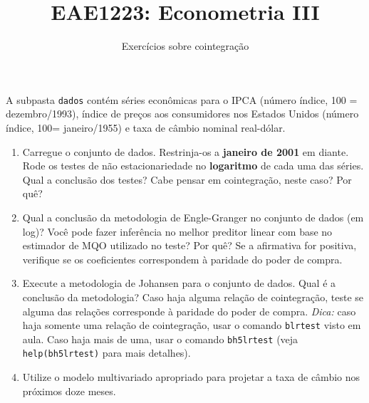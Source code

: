 \documentclass[10pt,a4paper]{article}
\title{\large EAE1223: Econometria III}
\author{\normalsize Exercícios sobre cointegração}
\date{}
\begin{document}
	\maketitle
	
A subpasta \texttt{dados} contém séries econômicas para o IPCA (número índice, 100 = dezembro/1993), índice de preços aos consumidores nos Estados Unidos (número índice, 100= janeiro/1955) e taxa de câmbio nominal real-dólar.
	
	
	\begin{enumerate}
		\item Carregue o conjunto de dados. Restrinja-os a \textbf{janeiro de 2001} em diante. Rode os testes de não estacionariedade no \textbf{logaritmo} de cada uma das séries. Qual a conclusão dos testes? Cabe pensar em cointegração, neste caso? Por quê?
		
		\item Qual a conclusão da metodologia de Engle-Granger no conjunto de dados (em log)? Você pode fazer inferência no melhor preditor linear com base no estimador de MQO utilizado no teste? Por quê? Se a afirmativa for positiva, verifique se os coeficientes correspondem à paridade do poder de compra.
		
		\item Execute a metodologia de Johansen para o conjunto de dados. Qual é a conclusão da metodologia? Caso haja alguma relação de cointegração, teste se alguma das relações corresponde à paridade do poder de compra. \textit{Dica:} caso haja somente uma relação de cointegração, usar o comando \texttt{blrtest} visto em aula. Caso haja mais de uma, usar o comando \texttt{bh5lrtest} (veja \texttt{help(bh5lrtest)} para mais detalhes).
		
		\item Utilize o modelo multivariado apropriado para projetar a taxa de câmbio nos próximos doze meses.
\end{enumerate}
\end{document}

